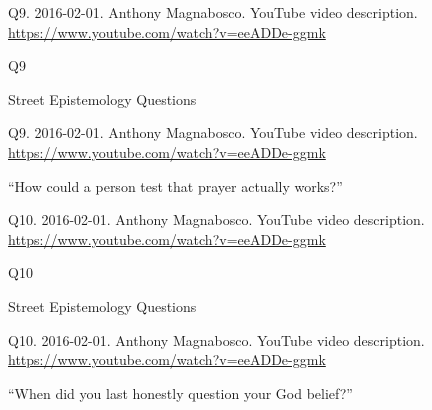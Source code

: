 \documentclass[
    src/templates/5x2-on-a4paper,
    frame
]{flashcards}
\newcommand{\myheader}{}
\newcommand{\myfooter}{
    \begin{flushright}
        \small\sc
        Street Epistemology Questions \par
    \end{flushright}
}
\begin{document}
        \renewcommand{\myheader}{
            \normalfont %
            \begin{tiny}
                Q9.
                2016-02-01.
                Anthony Magnabosco.
                    YouTube video description.
                    \\
                    \url{ https://www.youtube.com/watch?v=eeADDe-ggmk }
                \par
            \end{tiny}
        }
        \begin{flashcard}{
            \myheader
            \vspace{\fill}
            \begin{center}
                \large
                    Q9
            \end{center}
            \vspace{\fill}
            \myfooter
            \vspace{-1.4ex}
        }
            \myheader
            \vspace{\fill}
            \begin{center}
                \large
\enquote{How could a person test that prayer actually works?}            \end{center}
            \vspace{\fill}
        \end{flashcard}
        \renewcommand{\myheader}{
            \normalfont %
            \begin{tiny}
                Q10.
                2016-02-01.
                Anthony Magnabosco.
                    YouTube video description.
                    \\
                    \url{ https://www.youtube.com/watch?v=eeADDe-ggmk }
                \par
            \end{tiny}
        }
        \begin{flashcard}{
            \myheader
            \vspace{\fill}
            \begin{center}
                \large
                    Q10
            \end{center}
            \vspace{\fill}
            \myfooter
            \vspace{-1.4ex}
        }
            \myheader
            \vspace{\fill}
            \begin{center}
                \large
\enquote{When did you last honestly question your God belief?}            \end{center}
            \vspace{\fill}
        \end{flashcard}
\end{document}
